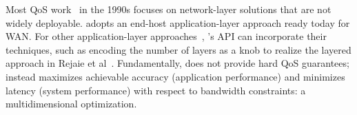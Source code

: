  Most QoS work~\cite{ferrari1990scheme, shenker1994integrated,
  shenker1995fundamental} in the 1990s focuses on network-layer solutions that
are not widely deployable. \sysname{} adopts an end-host application-layer
approach ready today for WAN. For other application-layer
approaches~\cite{vandalore2001survey}, \sysname{}'s API can incorporate their
techniques, such as encoding the number of layers as a knob to realize the
layered approach in Rejaie et al~\cite{rejaie2000layered}. Fundamentally,
\sysname{} does not provide hard QoS guarantees; instead \sysname{} maximizes
achievable accuracy (application performance) and minimizes latency (system
performance) with respect to bandwidth constraints: a multidimensional
optimization.






